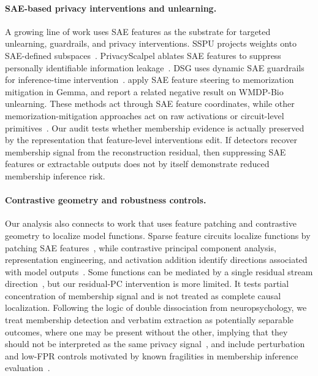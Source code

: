\paragraph{SAE-based privacy interventions and unlearning.}
A growing line of work uses SAE features as the substrate for targeted unlearning, guardrails, and privacy interventions. SSPU projects weights onto SAE-defined subspaces~\citep{wang2025sspu}. PrivacyScalpel ablates SAE features to suppress personally identifiable information leakage~\citep{frikha2025privacyscalpel,grande2026privacyscalpelv3}. DSG uses dynamic SAE guardrails for inference-time intervention~\citep{muhamed2025dsg}. \citet{suri2025mitigating} apply SAE feature steering to memorization mitigation in Gemma, and \citet{farrell2024applying} report a related negative result on WMDP-Bio unlearning. These methods act through SAE feature coordinates, while other memorization-mitigation approaches act on raw activations or circuit-level primitives~\citep{zhang2026gss,lasy2025memcircuits}. Our audit tests whether membership evidence is actually preserved by the representation that feature-level interventions edit. If detectors recover membership signal from the reconstruction residual, then suppressing SAE features or extractable outputs does not by itself demonstrate reduced membership inference risk.

\paragraph{Contrastive geometry and robustness controls.}
Our analysis also connects to work that uses feature patching and contrastive geometry to localize model functions. Sparse feature circuits localize functions by patching SAE features~\citep{marks2024sparse}, while contrastive principal component analysis, representation engineering, and activation addition identify directions associated with model outputs~\citep{abid2018exploring,zou2023representation,rimsky2024steering}. Some functions can be mediated by a single residual stream direction~\citep{arditi2024refusal}, but our residual-PC intervention is more limited. It tests partial concentration of membership signal and is not treated as complete causal localization. Following the logic of double dissociation from neuropsychology, we treat membership detection and verbatim extraction as potentially separable outcomes, where one may be present without the other, implying that they should not be interpreted as the same privacy signal~\citep{teuber1955physiological,shallice1988neuropsychology}, and include perturbation and low-FPR controls motivated by known fragilities in membership inference evaluation~\citep{duan2024membership,meeus2025sok}.


